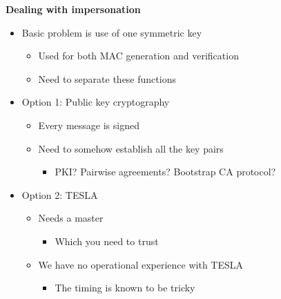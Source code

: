 \documentclass[helvetica]{seminar}
\newcommand{\heading}[1]{%
  \begin{center} 
    \large\bf 
    #1 
  \end{center} 
  \vspace{.4 in}}
\begin{document}
\begin{slide}
\heading{Dealing with impersonation}

\vspace{-.25 in}

\begin{itemize}
\item Basic problem is use of one symmetric key
\begin{itemize}
\item Used for both MAC generation and verification
\item Need to separate these functions
\end{itemize}
\item Option 1: Public key cryptography
\begin{itemize}
\item Every message is signed
\item Need to somehow establish all the key pairs
\begin{itemize}
\item PKI? Pairwise agreements? Bootstrap CA protocol?
\end{itemize}
\end{itemize}
\item Option 2: TESLA
\begin{itemize}
\item Needs a master
\begin{itemize}
\item Which you need to trust
\end{itemize}
\item We have no operational experience with TESLA
\begin{itemize}
\item The timing is known to be tricky
\end{itemize}
\end{itemize}
\end{itemize}
\end{slide}
\end{document}
